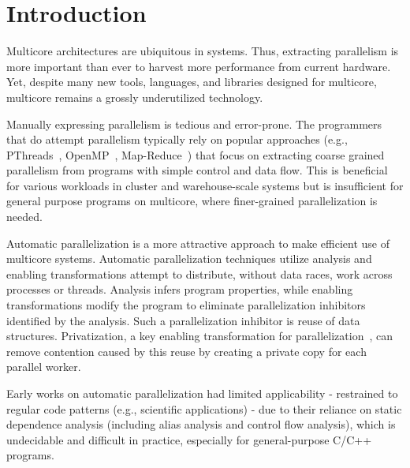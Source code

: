 \section{Introduction}

Multicore architectures are ubiquitous in systems.  Thus, extracting
parallelism is more important than ever to harvest more performance
from current hardware.
%
Yet, despite many new tools, languages, and libraries designed for
multicore, multicore remains a grossly underutilized technology.

%
Manually expressing parallelism is tedious and error-prone. The
programmers that do attempt parallelism typically rely on popular
approaches (e.g., PThreads~\cite{pthread:web},
OpenMP~\cite{openmp:web}, Map-Reduce~\cite{dean:08:cacm}) that focus
on extracting coarse grained parallelism from programs with simple
control and data flow. This is beneficial for various workloads in
cluster and warehouse-scale systems but is insufficient for general
purpose programs on multicore, where finer-grained parallelization is
needed.

%


Automatic parallelization is a more attractive approach to make
efficient use of multicore systems.
%
Automatic parallelization techniques utilize analysis and enabling
transformations attempt to distribute, without data races, work across
processes or threads.
%
Analysis infers program properties, while enabling transformations
modify the program to eliminate parallelization inhibitors identified
by the analysis.
%
Such a parallelization inhibitor is reuse of data structures.
Privatization, a key enabling transformation for
parallelization~\cite{citations_from_privateer}, can remove contention
caused by this reuse by creating a private copy for each parallel
worker.

Early works on automatic parallelization had limited applicability -
restrained to regular code patterns (e.g., scientific applications) -
due to their reliance on static dependence analysis (including alias
analysis and control flow analysis), which is undecidable and
difficult in practice, especially for general-purpose C/C++ programs.

